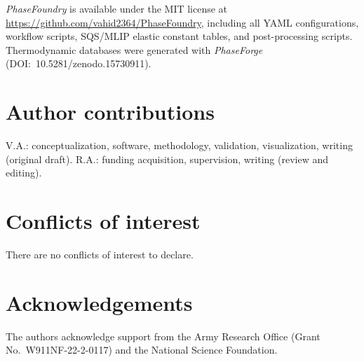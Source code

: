 \documentclass[12pt]{article}
\begin{document}
\textit{PhaseFoundry} is available under the MIT license at \url{https://github.com/vahid2364/PhaseFoundry}, including all YAML configurations, workflow scripts, SQS/MLIP elastic constant tables, and post-processing scripts. Thermodynamic databases were generated with \textit{PhaseForge}\cite{sariturk2025phaseforge} (DOI:~10.5281/zenodo.15730911).

\section*{Author contributions}

V.A.: conceptualization, software, methodology, validation, visualization, writing (original draft). R.A.: funding acquisition, supervision, writing (review and editing).

\section*{Conflicts of interest}

There are no conflicts of interest to declare.

\section*{Acknowledgements}

The authors acknowledge support from the Army Research Office (Grant No.\ W911NF-22-2-0117) and the National Science Foundation.



\end{document}
